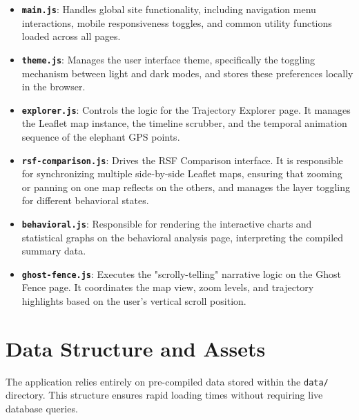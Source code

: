 \documentclass[12pt]{article}
\begin{document}
\begin{itemize}
    \item \textbf{\texttt{main.js}}: Handles global site functionality, including navigation menu interactions, mobile responsiveness toggles, and common utility functions loaded across all pages.
    \item \textbf{\texttt{theme.js}}: Manages the user interface theme, specifically the toggling mechanism between light and dark modes, and stores these preferences locally in the browser.
    \item \textbf{\texttt{explorer.js}}: Controls the logic for the Trajectory Explorer page. It manages the Leaflet map instance, the timeline scrubber, and the temporal animation sequence of the elephant GPS points.
    \item \textbf{\texttt{rsf-comparison.js}}: Drives the RSF Comparison interface. It is responsible for synchronizing multiple side-by-side Leaflet maps, ensuring that zooming or panning on one map reflects on the others, and manages the layer toggling for different behavioral states.
    \item \textbf{\texttt{behavioral.js}}: Responsible for rendering the interactive charts and statistical graphs on the behavioral analysis page, interpreting the compiled summary data.
    \item \textbf{\texttt{ghost-fence.js}}: Executes the "scrolly-telling" narrative logic on the Ghost Fence page. It coordinates the map view, zoom levels, and trajectory highlights based on the user's vertical scroll position.
\end{itemize}

\section{Data Structure and Assets}
The application relies entirely on pre-compiled data stored within the \texttt{data/} directory. This structure ensures rapid loading times without requiring live database queries.
\end{document}
